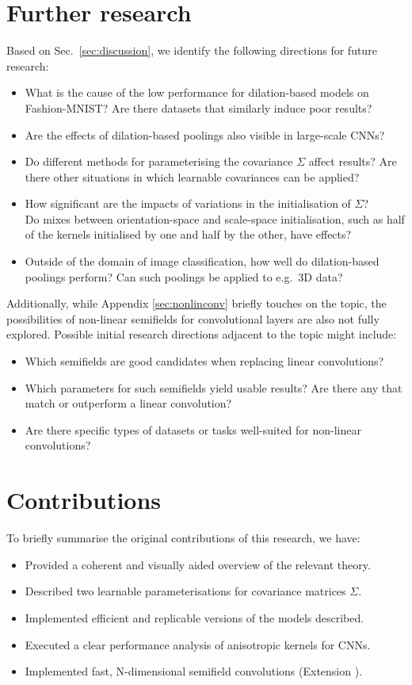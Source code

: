 \documentclass[a4paper, 12pt]{report}
\begin{document}
\section{Further research}
Based on Sec.\ \ref{sec:discussion}, we identify the following directions for future research:
\begin{itemize}
\setlength{\itemsep}{1pt}
	\item What is the cause of the low performance for dilation-based models on Fashion-MNIST? Are there datasets that similarly induce poor results?
	\item Are the effects of dilation-based poolings also visible in large-scale CNNs?
	\item Do different methods for parameterising the covariance $\Sigma$ affect results? 
		  Are there other situations in which learnable covariances can be applied?
	\item How significant are the impacts of variations in the initialisation of $\Sigma$? \\
	      Do mixes between orientation-space and scale-space initialisation, such as half of the kernels initialised by one and half by the other, have effects?
	 \item Outside of the domain of image classification, how well do dilation-based poolings perform? Can such poolings be applied to e.g.\ 3D data?
\end{itemize}
Additionally, while Appendix \ref{sec:nonlinconv} briefly touches on the topic, the possibilities of non-linear semifields for convolutional layers are also not fully explored.
Possible initial research directions adjacent to the topic might include:
\begin{itemize}
\setlength{\itemsep}{1pt}
	\item Which semifields are good candidates when replacing linear convolutions?
	\item Which parameters for such semifields yield usable results? Are there any that match or outperform a linear convolution?
	\item Are there specific types of datasets or tasks well-suited for non-linear convolutions?
\end{itemize}
\section{Contributions}
To briefly summarise the original contributions of this research, we have:
\begin{itemize}
\setlength{\itemsep}{0pt}
	\item Provided a coherent and visually aided overview of the relevant theory.
	\item Described two learnable parameterisations for covariance matrices $\Sigma$.
	\item Implemented efficient and replicable versions of the models described.
	\item Executed a clear performance analysis of anisotropic kernels for CNNs.
	\item Implemented fast, N-dimensional semifield convolutions (Extension \cite{extension}).
\end{itemize}
\end{document}

